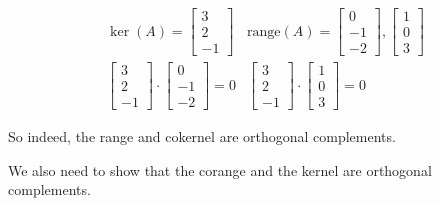 \documentclass[10pt,letterpaper]{article}
\begin{document}
	\begin{align*}
	& \ker(A) = \begin{bmatrix}
	3 \\ 2 \\ -1
	\end{bmatrix} & \text{range}(A) = \begin{bmatrix}
	0 \\ -1 \\ -2
	\end{bmatrix}, \begin{bmatrix}
	1 \\ 0 \\ 3
	\end{bmatrix} \\
	& \boxed{\begin{bmatrix}
	3 \\ 2 \\ -1
	\end{bmatrix} \cdot \begin{bmatrix}
	0 \\ -1 \\ -2
	\end{bmatrix} = 0} & \boxed{\begin{bmatrix}
	3 \\ 2 \\ -1
	\end{bmatrix} \cdot \begin{bmatrix}
	1 \\ 0 \\ 3
	\end{bmatrix} = 0}
	\end{align*}
	
	So indeed, the range and cokernel are orthogonal complements. 
	
	We also need to show that the corange and the kernel are orthogonal complements. 
	
\end{document}
